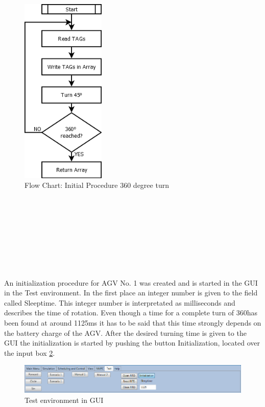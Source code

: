 \begin{figure}[!htbp]
\centering
\includegraphics[width = 4cm]{Pictures/SFC_Init_Procedure}
\caption{Flow Chart: Initial Procedure 360 degree turn}
\label{SFC_Init_Procedure}
\end{figure}\\\\\\\\\\\\\\\\
An initialization procedure for AGV No. 1 was created and is started in the GUI in the Test environment. In the first place an integer number is given to the field called Sleeptime. This integer number is interpretated as milliseconds and describes the time of rotation. Even though a time for a complete turn of 360\textdegree  has been found at around 1125ms it has to be said that this time strongly depends on the battery charge of the AGV. After the desired turning time is given to the GUI the initialization is started by pushing the button Initialization, located over the input box \ref{Screenshot_Test_environment}.\\
\begin{figure}[!htbp]
\centering
\includegraphics[width = 16cm]{Pictures/Screenshot_Test_environment}
\caption{Test environment in GUI}
\label{Screenshot_Test_environment}
\end{figure}\\
